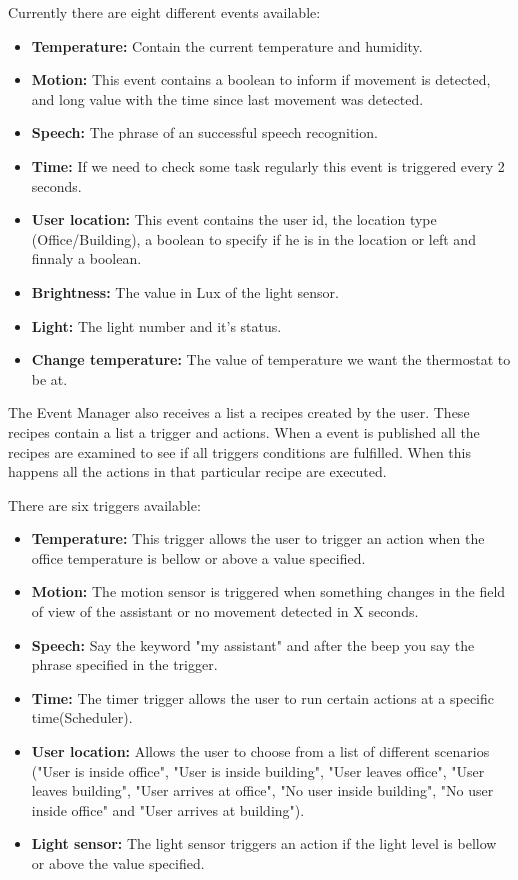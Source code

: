 Currently there are eight different events available:

\begin{itemize}
  \item \textbf{Temperature:} Contain the current temperature and humidity.
  \item \textbf{Motion:} This event contains a boolean to inform if movement is detected, and long value with the time since last movement was detected.
  \item \textbf{Speech:} The phrase of an successful speech recognition.  
  \item \textbf{Time:} If we need to check some task regularly this event is triggered every 2 seconds.  
  \item \textbf{User location:} This event contains the user id, the location type (Office/Building), a boolean to specify if he is in the location or left and finnaly a boolean.
  \item \textbf{Brightness:} The value in Lux of the light sensor.  
  \item \textbf{Light:} The light number and it's status. 
  \item \textbf{Change temperature:} The value of temperature we want the thermostat to be at. 
  
\end{itemize}


The Event Manager also receives a list a recipes created by the user. These recipes contain a list a trigger and actions. When a event is published all the recipes are examined to see if all triggers conditions are fulfilled. When this happens all the actions in that particular recipe are executed.

There are six triggers available:

\begin{itemize}
  \item \textbf{Temperature:} This trigger allows the user to trigger an action when the office temperature is bellow or above a value specified.
  \item \textbf{Motion:} The motion sensor is triggered when something changes in the field of view of the assistant or no movement detected in X seconds.
  \item \textbf{Speech:} Say the keyword "my assistant" and after the beep you say the phrase specified in the trigger.  
  \item \textbf{Time:} The timer trigger allows the user to run certain actions at a specific time(Scheduler).  
  \item \textbf{User location:} Allows the user to choose from a list of different scenarios ("User is inside office", "User is inside building", "User leaves office", "User leaves building", "User arrives at office", "No user inside building", "No user inside office" and "User arrives at building").
  \item \textbf{Light sensor:} The light sensor triggers an action if the light level is bellow or above the value specified.
  
\end{itemize}

